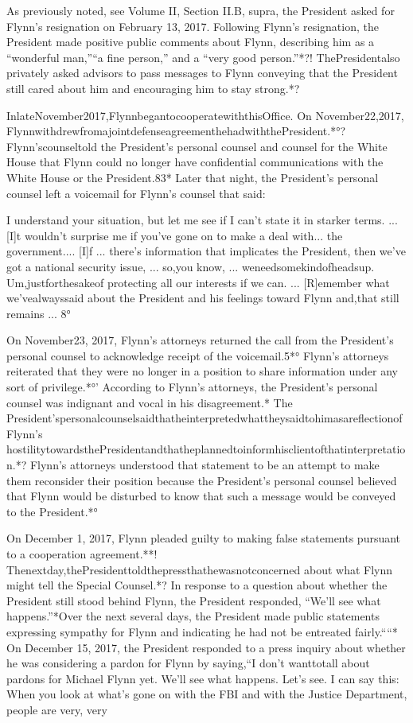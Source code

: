 As previously noted, see Volume II, Section II.B, supra, the President asked for Flynn's resignation on February 13, 2017. Following Flynn's resignation, the President made positive public comments about Flynn, describing him as a “wonderful man,”“a fine person,” and a “very good person.”*?! ThePresidentalso privately asked advisors to pass messages to Flynn conveying that the President still cared about him and encouraging him to stay strong.*?

InlateNovember2017,FlynnbegantocooperatewiththisOffice. On November22,2017, FlynnwithdrewfromajointdefenseagreementhehadwiththePresident.*°? Flynn'scounseltold the President's personal counsel and counsel for the White House that Flynn could no longer have confidential communications with the White House or the President.83* Later that night, the President's personal counsel left a voicemail for Flynn's counsel that said:

I understand your situation, but let me see if I can't state it in starker terms. ... [I]t wouldn't surprise me if you've gone on to make a deal with... the government.... [I]f ... there's information that implicates the President, then we've got a national security issue, ... so,you know, ... weneedsomekindofheadsup. Um,justforthesakeof protecting all our interests if we can. ... [R]emember what we'vealwayssaid about the
President and his feelings toward Flynn and,that still remains ... 8°

On November23, 2017, Flynn's attorneys returned the call from the President's personal counsel to acknowledge receipt of the voicemail.5*° Flynn's attorneys reiterated that they were no longer in a position to share information under any sort of privilege.*°' According to Flynn's attorneys, the President's personal counsel was indignant and vocal in his disagreement.* The President'spersonalcounselsaidthatheinterpretedwhattheysaidtohimasareflectionofFlynn's hostilitytowardsthePresidentandthatheplannedtoinformhisclientofthatinterpretation.*? Flynn's attorneys understood that statement to be an attempt to make them reconsider their position because the President's personal counsel believed that Flynn would be disturbed to know that such a message would be conveyed to the President.*°

On December 1, 2017, Flynn pleaded guilty to making false statements pursuant to a cooperation agreement.**! Thenextday,thePresidenttoldthepressthathewasnotconcerned about what Flynn might tell the Special Counsel.*? In response to a question about whether the President still stood behind Flynn, the President responded, “We'll see what happens.”*Over the next several days, the President made public statements expressing sympathy for Flynn and indicating he had not be entreated fairly.““* On December 15, 2017, the President responded to a press inquiry about whether he was considering a pardon for Flynn by saying,“I don't wanttotall about pardons for Michael Flynn yet. We'll see what happens. Let's see. I can say this: When you look at what's gone on with the FBI and with the Justice Department, people are very, very

